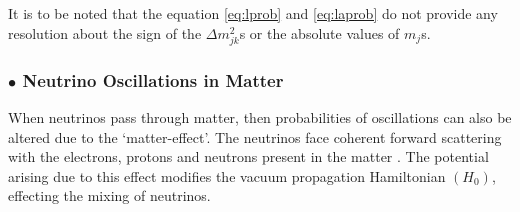 It is to be noted that the equation \ref{eq:lprob} and \ref{eq:laprob}
do not provide any resolution about the sign of the $\Delta m_{jk}^{2}$s
or the absolute values of $m_{j}$s.

\subsubsection{$\bullet$ Neutrino Oscillations in Matter}

When neutrinos pass through matter, then probabilities of oscillations
can also be altered due to the `matter-effect'. The neutrinos face
coherent forward scattering with the electrons, protons and neutrons
present in the matter \cite{mattereffect}. The potential arising due to
this effect modifies the vacuum propagation Hamiltonian
$\left(H_{0}\right)$, effecting the mixing of neutrinos.

